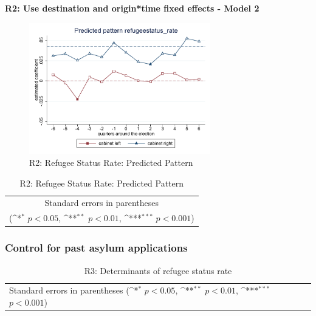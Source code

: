 \documentclass[10pt,a4paper]{scrartcl}
\begin{document}
\clearpage
\textbf{R2: Use destination and origin*time fixed effects - Model 2}
\begin{figure}[!ht]
	\centering
	\includegraphics[width=0.7\textwidth]{figures_edited/refugeestatus_rate_graph2_R2.pdf}
	\caption{R2: Refugee Status Rate: Predicted Pattern}
\end{figure}

\begin{table}[!ht]\centering
	\footnotesize
	\renewcommand{\arraystretch}{1.2}
	\def\sym#1{\ifmmode^{#1}\else\(^{#1}\)\fi}
	\caption{R2: Refugee Status Rate: Predicted Pattern}
	\begin{tabular}{l*{2}{c}}
		\hline\hline
		
		\hline\hline
		\multicolumn{3}{c}{\footnotesize Standard errors in parentheses} \\
		\multicolumn{3}{c}{\footnotesize (\sym{*} \(p<0.05\), \sym{**} \(p<0.01\), \sym{***} \(p<0.001\))}\\
	\end{tabular}
\end{table}




\clearpage
\FloatBarrier
\subsubsection{Control for past asylum applications}
\begin{table}[!ht]\centering
	\renewcommand{\arraystretch}{1.25}
	\small
	\def\sym#1{\ifmmode^{#1}\else\(^{#1}\)\fi}
	\caption{R3: Determinants of refugee status rate}
	\begin{tabular}{l*{3}{c}}
		\hline\hline
		
		\hline\hline
		\multicolumn{4}{l}{\footnotesize Standard errors in parentheses (\sym{*} \(p<0.05\), \sym{**} \(p<0.01\), \sym{***} \(p<0.001\))}\\
	\end{tabular}
\end{table}
\end{document}
